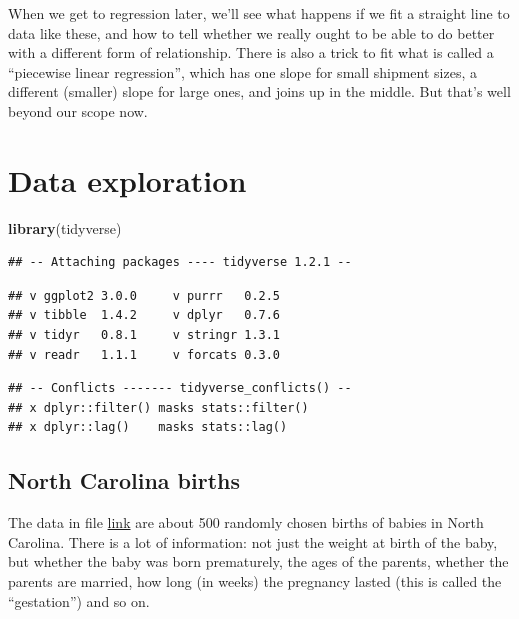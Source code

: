 \documentclass[]{tufte-book}
\newenvironment{Shaded}{}{}
\newcommand{\KeywordTok}[1]{\textcolor[rgb]{0.00,0.44,0.13}{\textbf{#1}}}
\newcommand{\NormalTok}[1]{#1}
\theoremstyle{definition}
\theoremstyle{definition}
\theoremstyle{definition}
\theoremstyle{remark}
\begin{document}
When we get to regression later, we'll see what happens if we fit a
straight line to data like these, and how to tell whether we really
ought to be able to do better with a different form of relationship.
There is also a trick to fit what is called a ``piecewise linear
regression'', which has one slope for small shipment sizes, a different
(smaller) slope for large ones, and joins up in the middle. But that's
well beyond our scope now.

\hypertarget{data-exploration}{%
\chapter{Data exploration}\label{data-exploration}}

\begin{Shaded}
\begin{Highlighting}[]
\KeywordTok{library}\NormalTok{(tidyverse)}
\end{Highlighting}
\end{Shaded}

\begin{verbatim}
## -- Attaching packages ---- tidyverse 1.2.1 --
\end{verbatim}

\begin{verbatim}
## v ggplot2 3.0.0     v purrr   0.2.5
## v tibble  1.4.2     v dplyr   0.7.6
## v tidyr   0.8.1     v stringr 1.3.1
## v readr   1.1.1     v forcats 0.3.0
\end{verbatim}

\begin{verbatim}
## -- Conflicts ------- tidyverse_conflicts() --
## x dplyr::filter() masks stats::filter()
## x dplyr::lag()    masks stats::lag()
\end{verbatim}

\hypertarget{north-carolina-births}{%
\section{North Carolina births}\label{north-carolina-births}}

The data in file
\href{http://www.utsc.utoronto.ca/~butler/c32/ncbirths.csv}{link} are
about 500 randomly chosen births of babies in North Carolina. There is a
lot of information: not just the weight at birth of the baby, but
whether the baby was born prematurely, the ages of the parents, whether
the parents are married, how long (in weeks) the pregnancy lasted (this
is called the ``gestation'') and so on.
\end{document}
